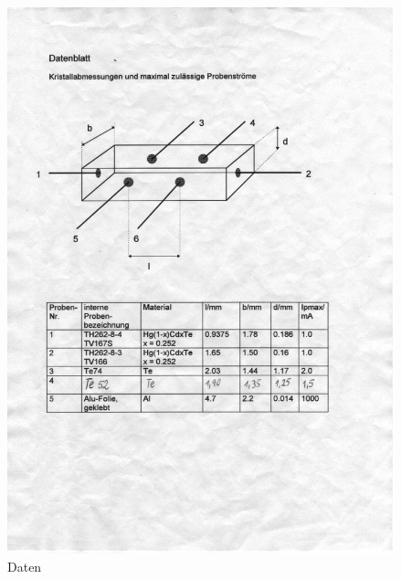 \begin{figure}[htb!]
 \centering
 \includegraphics[viewport=55 200 500 390,clip]{../docs/scan_datenblatt}
 \caption{Daten}
 \label{fig:daten}
\end{figure}